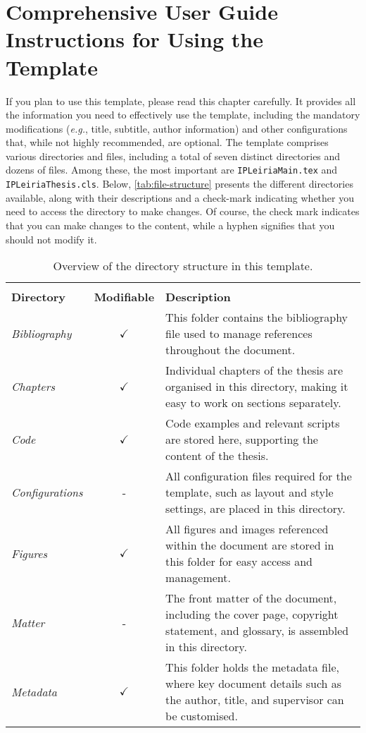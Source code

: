 \chapter[Comprehensive User Guide: Instructions for Using the Template]{Comprehensive User Guide Instructions for Using the Template}\label{cp:user-guide}

If you plan to use this template, please read this chapter carefully. It provides all the information you need to effectively use the template, including the mandatory modifications (\textit{e.g.}, title, subtitle, author information) and other configurations that, while not highly recommended, are optional. The template comprises various directories and files, including a total of seven distinct directories and dozens of files. Among these, the most important are \texttt{IPLeiriaMain.tex} and \texttt{IPLeiriaThesis.cls}. Below, \autoref{tab:file-structure} presents the different directories available, along with their descriptions and a check-mark indicating whether you need to access the directory to make changes. Of course, the check mark indicates that you can make changes to the content, while a hyphen signifies that you should not modify it.

\begin{table}[!htpb]
    \setlength{\extrarowheight}{2pt}
    \caption[Directory structure and file organisation]{Overview of the directory structure in this template.}\label{tab:file-structure}
    \begin{tabularx}{\textwidth}{lcX}
        \toprule
        \\[-1.5\normalbaselineskip]
        \textbf{Directory} & \textbf{Modifiable} & \textbf{Description} \\ [0em]
        \midrule
        \textit{Bibliography} & $\checkmark$ & This folder contains the bibliography file used to manage references throughout the document. \\
        \textit{Chapters} & $\checkmark$ & Individual chapters of the thesis are organised in this directory, making it easy to work on sections separately. \\
        \textit{Code} & $\checkmark$ & Code examples and relevant scripts are stored here, supporting the content of the thesis. \\
        \textit{Configurations} & - & All configuration files required for the template, such as layout and style settings, are placed in this directory. \\
        \textit{Figures} & $\checkmark$ & All figures and images referenced within the document are stored in this folder for easy access and management. \\
        \textit{Matter} & - & The front matter of the document, including the cover page, copyright statement, and glossary, is assembled in this directory. \\
        \textit{Metadata} & $\checkmark$ & This folder holds the metadata file, where key document details such as the author, title, and supervisor can be customised. \\
        \bottomrule
    \end{tabularx}
\end{table}

